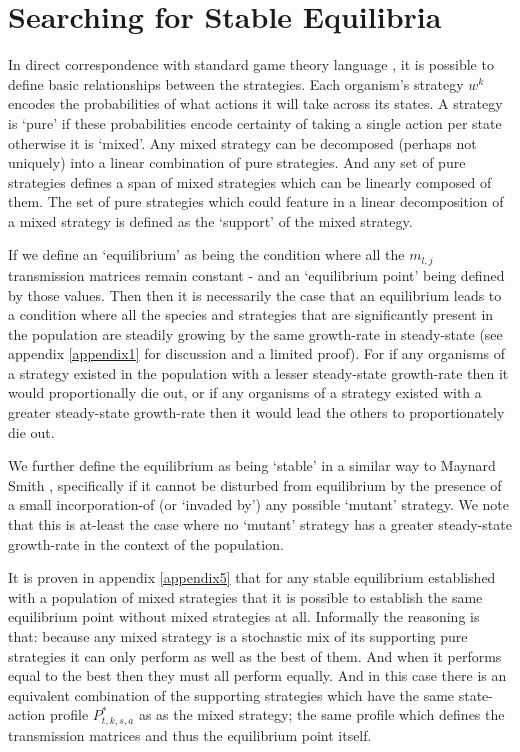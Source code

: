 \section{Searching for Stable Equilibria}\label{sec:equilibria}

In direct correspondence with standard game theory language \cite{weibull}, it is possible to define basic relationships between the strategies.
Each organism's strategy $w^k$ encodes the probabilities of what actions it will take across its states.  A strategy is `pure' if these probabilities encode certainty of taking a single action per state otherwise it is `mixed'. Any mixed strategy can be decomposed (perhaps not uniquely) into a linear combination of pure strategies. And any set of pure strategies defines a span of mixed strategies which can be linearly composed of them.
The set of pure strategies which could feature in a linear decomposition of a mixed strategy is defined as the `support' of the mixed strategy.

If we define an `equilibrium' as being the condition where all the $m_{l,j}$ transmission matrices remain constant - and an `equilibrium point' being defined by those values.
Then then it is necessarily the case that an equilibrium leads to a condition where all the species and strategies that are significantly present in the population are steadily growing by the same growth-rate in steady-state (see appendix \ref{appendix1} for discussion and a limited proof). For if any organisms of a strategy existed in the population with a lesser steady-state growth-rate then it would proportionally die out, or if any organisms of a strategy existed with a greater steady-state growth-rate then it would lead the others to proportionately die out.

We further define the equilibrium as being `stable' in a similar way to Maynard Smith \cite{maynard, maynard2, weibull}, specifically if it cannot be disturbed from equilibrium by the presence of a small incorporation-of (or `invaded by') any possible `mutant' strategy. We note that this is at-least the case where no `mutant' strategy has a greater steady-state growth-rate in the context of the population.

It is proven in appendix \ref{appendix5} that for any stable equilibrium established with a population of mixed strategies that it is possible to establish the same equilibrium point without mixed strategies at all.
Informally the reasoning is that: because any mixed strategy is a stochastic mix of its supporting pure strategies it can only perform as well as the best of them. And when it performs equal to the best then they must all perform equally. And in this case there is an equivalent combination of the supporting strategies which have the same state-action profile $P^*_{t,k,s,a}$ as as the mixed strategy; the same profile which defines the transmission matrices and thus the equilibrium point itself.

